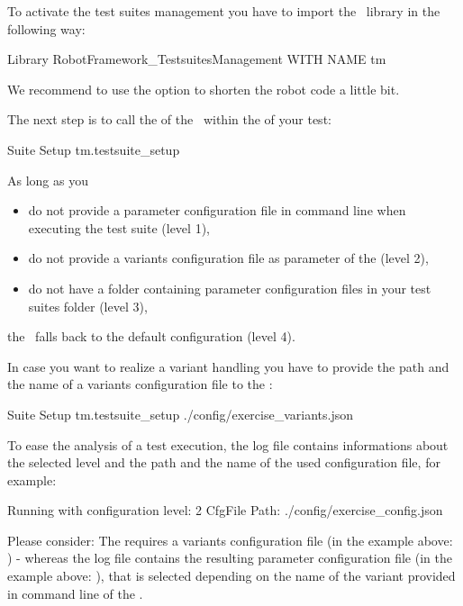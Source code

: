 To activate the test suites management you have to import the \pkg\ library in the following way:

\begin{robotcode}
Library    RobotFramework_TestsuitesManagement    WITH NAME    tm
\end{robotcode}

We recommend to use the  option to shorten the robot code a little bit.

The next step is to call the  of the \pkg\ within the  of your test:

\begin{robotcode}
Suite Setup    tm.testsuite_setup
\end{robotcode}

As long as you
\begin{itemize}
   \item do not provide a parameter configuration file in command line when executing the test suite (level 1),
   \item do not provide a variants configuration file as parameter of the  (level 2),
   \item do not have a  folder containing parameter configuration files in your test suites folder (level 3),
\end{itemize}
the \pkg\ falls back to the default configuration (level 4).

In case you want to realize a variant handling you have to provide the path and the name of a variants configuration file to the :

\begin{robotcode}
Suite Setup    tm.testsuite_setup    ./config/exercise_variants.json
\end{robotcode}

To ease the analysis of a test execution, the log file contains informations about the selected level and the path and the name of the used
configuration file, for example:

\begin{robotlog}
Running with configuration level: 2
CfgFile Path: ./config/exercise_config.json
\end{robotlog}

Please consider: The  requires a variants configuration file (in the example above: ) - whereas
the log file contains the resulting parameter configuration file (in the example above: ), that is selected depending
on the name of the variant provided in command line of the \rfwcore.

